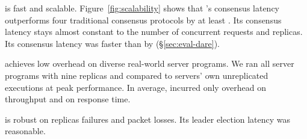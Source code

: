 \begin{tightenum}

\item \xxx is fast and scalable. Figure~\ref{fig:scalability} shows that \xxx's 
consensus latency outperforms four traditional consensus protocols by at least
\comptradlow. Its consensus latency stays almost constant to the number 
of concurrent requests and replicas. Its consensus latency was faster than 
\dare by \fasterDARE (\S\ref{sec:eval-dare}).



\item \xxx achieves low overhead on diverse real-world server programs. We ran 
all \nprog server programs with nine replicas and compared to servers' own 
unreplicated executions at peak performance. In average, \xxx incurred only 
\tputoverhead overhead on throughput and \latencyoverhead on response time.
 
\item \xxx is robust on replicas failures and packet losses. Its leader 
election latency was reasonable.



\end{tightenum}







